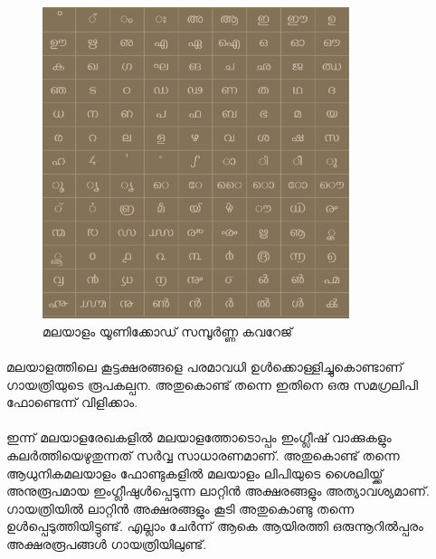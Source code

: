 \documentclass[12pt]{report}
\begin{document}
	\begin{figure}
		\begin{centering}
			\includegraphics[width=0.8\textwidth]{ml-unicode.png}
			\caption{മലയാളം യൂണിക്കോഡ് സമ്പൂര്‍ണ്ണ കവറേജ്}
			\label{unicode}
		\end{centering}
	\end{figure}
	
	\paragraph{}
	മലയാളത്തിലെ കൂട്ടക്ഷരങ്ങളെ പരമാവധി ഉള്‍ക്കൊള്ളിച്ചുകൊണ്ടാണ് ഗായത്രിയുടെ രൂപകല്പന‍. അതുകൊണ്ട് തന്നെ ഇതിനെ ഒരു സമഗ്രലിപി ഫോണ്ടെന്ന് വിളിക്കാം.
	
	\paragraph{}
	ഇന്ന് മലയാളരേഖകളില്‍ മലയാളത്തോടൊപ്പം ഇംഗ്ലീഷ് വാക്കുകളും കലര്‍ത്തിയെഴുതുന്നത് സര്‍വ്വ സാധാരണമാണ്. അതുകൊണ്ട് തന്നെ ആധുനികമലയാളം ഫോണ്ടുകളില്‍ മലയാളം ലിപിയുടെ ശൈലിയ്ക്ക് അനുരൂപമായ ഇംഗ്ലീഷുള്‍പ്പെടുന്ന ലാറ്റിന്‍ അക്ഷരങ്ങളും അത്യാവശ്യമാണ്. ഗായത്രിയിൽ ലാറ്റിന്‍ അക്ഷരങ്ങളും കൂടി അതുകൊണ്ടു തന്നെ ഉള്‍പ്പെടുത്തിയിട്ടുണ്ട്.  എല്ലാം ചേര്‍ന്ന് ആകെ ആയിരത്തി ഒരുന്നൂറിൽപ്പരം അക്ഷരരൂപങ്ങൾ‍ ഗായത്രിയിലുണ്ട്. 
	
\end{document}
